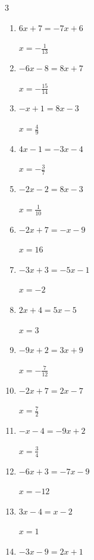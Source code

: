 \begin{multicols}{3}
\begin{enumerate}
        $\displaystyle x=-\frac{8}{11}$

  \item $6x+7=-7x+6$

        $\displaystyle x=-\frac{1}{13}$

  \item $-6x-8=8x+7$

        $\displaystyle x=-\frac{15}{14}$

  \item $-x+1=8x-3$

        $\displaystyle x=\frac{4}{9}$

  \item $4x-1=-3x-4$

        $\displaystyle x=-\frac{3}{7}$

  \item $-2x-2=8x-3$

        $\displaystyle x=\frac{1}{10}$

  \item $-2x+7=-x-9$

        $\displaystyle x=16$

  \item $-3x+3=-5x-1$

        $\displaystyle x=-2$

  \item $2x+4=5x-5$

        $\displaystyle x=3$

  \item $-9x+2=3x+9$

        $\displaystyle x=-\frac{7}{12}$

  \item $-2x+7=2x-7$

        $\displaystyle x=\frac{7}{2}$

  \item $-x-4=-9x+2$

        $\displaystyle x=\frac{3}{4}$

\columnbreak %

\resetques

  \item $-6x+3=-7x-9$

        $\displaystyle x=-12$

  \item $3x-4=x-2$

        $\displaystyle x=1$

  \item $-3x-9=2x+1$


\end{enumerate}
\end{multicols}
